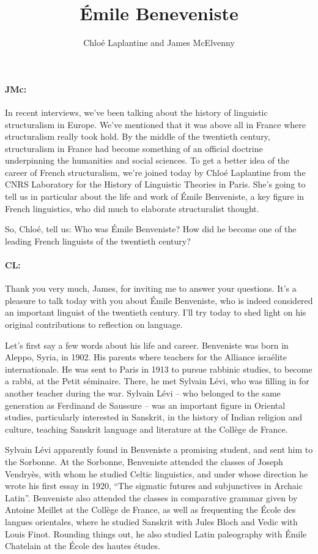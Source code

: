 \documentclass[output=paper]{langscibook}
\author{Chloé Laplantine\orcid{}\affiliation{University of Paris, CNRS Histoire des théories linguistiques} and James McElvenny\affiliation{University of Siegen}}
\title{Émile Beneveniste}
\begin{document}
\maketitle 


\paragraph*{JMc:} In recent interviews, we’ve been talking about the history of linguistic structuralism in Europe. We’ve mentioned that it was above all in France where structuralism really took hold. By the middle of the twentieth century, structuralism in France had become something of an official doctrine underpinning the humanities and social sciences. To get a better idea of the career of French structuralism, we’re joined today by Chloé Laplantine from the CNRS Laboratory for the History of Linguistic Theories in Paris. She’s going to tell us in particular about the life and work of Émile Benveniste, a key figure in French linguistics, who did much to elaborate structuralist thought.

So, Chloé, tell us: Who was Émile Benveniste? How did he become one of the leading French linguists of the twentieth century?

\paragraph*{CL:} Thank you very much, James, for inviting me to answer your questions. It’s a pleasure to talk today with you about Émile Benveniste, who is indeed considered an important linguist of the twentieth century. I’ll try today to shed light on his original contributions to reflection on language.

Let’s first say a few words about his life and career. Benveniste was born in Aleppo, Syria, in 1902. His parents where teachers for the Alliance israélite internationale. He was sent to Paris in 1913 to pursue rabbinic studies, to become a rabbi, at the Petit séminaire. There, he met Sylvain Lévi, who was filling in for another teacher during the war. Sylvain Lévi – who belonged to the same generation as Ferdinand de Saussure – was an important figure in Oriental studies, particularly interested in Sanskrit, in the history of Indian religion and culture, teaching Sanskrit language and literature at the Collège de France. 

Sylvain Lévi apparently found in Benveniste a promising student, and sent him to the Sorbonne. At the Sorbonne, Benveniste attended the classes of Joseph Vendryès, with whom he studied Celtic linguistics, and under whose direction he wrote his first essay in 1920, “The sigmatic futures and subjunctives in Archaic Latin”. Benveniste also attended the classes in comparative grammar given by Antoine Meillet at the Collège de France, as well as frequenting the École des langues orientales, where he studied Sanskrit with Jules Bloch and Vedic with Louis Finot. Rounding things out, he also studied Latin paleography with Émile Chatelain at the École des hautes études. 
\end{document}
